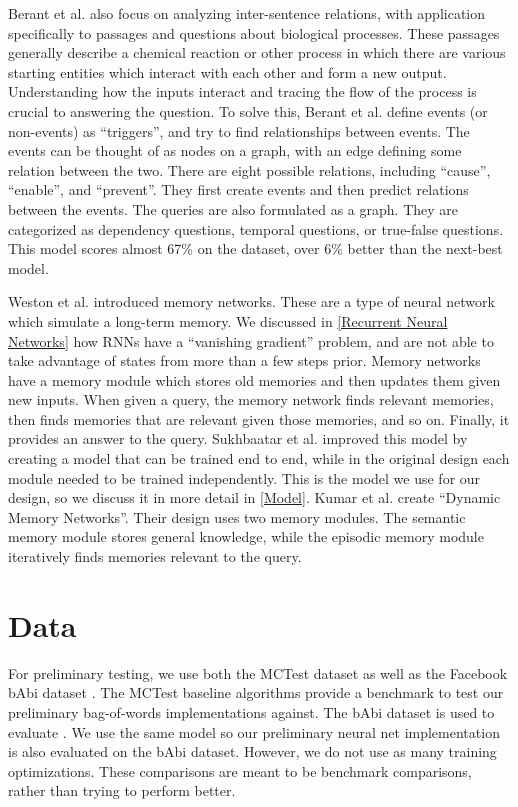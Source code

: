 \documentclass[pageno]{jpaper}
\begin{document}
Berant et al.\cite{Berant2014} also focus on analyzing inter-sentence
relations, with application specifically to passages and questions about
biological processes. These passages generally describe a chemical reaction or
other process in which there are various starting entities which interact with
each other and form a new output. Understanding how the inputs interact and
tracing the flow of the process is crucial to answering the question. To solve
this, Berant et al. define events (or non-events) as ``triggers'', and try to
find relationships between events. The events can be thought of as nodes on a
graph, with an edge defining some relation between the two. There are eight
possible relations, including ``cause'', ``enable'', and ``prevent''. They
first create events and then predict relations between the events. The queries
are also formulated as a graph. They are categorized as dependency questions,
temporal questions, or true-false questions. This model scores almost 67\% on
the dataset, over 6\% better than the next-best model.

Weston et al.\cite{Weston2015a} introduced memory networks. These are a type of
neural network which simulate a long-term memory. We discussed in
\ref{Recurrent Neural Networks} how RNNs have a ``vanishing gradient'' problem,
and are not able to take advantage of states from more than a few steps prior.
Memory networks have a memory module which stores old memories and then updates
them given new inputs. When given a query, the memory network finds relevant
memories, then finds memories that are relevant given those memories, and so
on. Finally, it provides an answer to the query. Sukhbaatar et
al.\cite{Sukhbaatar2015} improved this model by creating a model that can be
trained end to end, while in the original design each module needed to be
trained independently. This is the model we use for our design, so we discuss
it in more detail in \ref{Model}. Kumar et al.\cite{Kumar2015} create ``Dynamic
Memory Networks''. Their design uses two memory modules. The semantic memory
module stores general knowledge, while the episodic memory module iteratively
finds memories relevant to the query.

\section{Data}
\label{Data}

For preliminary testing, we use both the MCTest \cite{Richardson2013} dataset as
well as the Facebook bAbi dataset \cite{Weston2015}. The MCTest baseline
algorithms provide a benchmark to test our preliminary bag-of-words
implementations against. The bAbi dataset is used to evaluate
\cite{Sukhbaatar2015}. We use the same model so our preliminary neural net
implementation is also evaluated on the bAbi dataset. However, we do not use as
many training optimizations. These comparisons are meant to be benchmark
comparisons, rather than trying to perform better.
\end{document}
